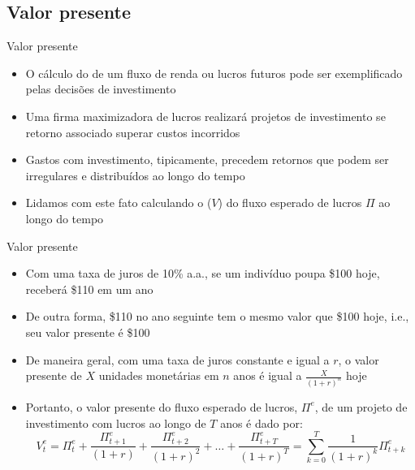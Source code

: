 \documentclass[10pt]{beamer}
\begin{document}
\subsection{Valor presente}
\begin{frame}
    {Valor presente}
    \begin{itemize}
        \item O cálculo do  de um fluxo de renda ou lucros futuros pode ser exemplificado pelas decisões de investimento\bigskip
        \item Uma firma maximizadora de lucros realizará projetos de investimento se retorno associado superar custos incorridos\bigskip
        \item Gastos com investimento, tipicamente, precedem retornos que podem ser irregulares e distribuídos ao longo do tempo\bigskip
        \item Lidamos com este fato calculando o  ($V$) do fluxo esperado de lucros $\Pi$ ao longo do tempo
    \end{itemize}
\end{frame}

\begin{frame}
    {Valor presente}
    \begin{itemize}
        \item Com uma taxa de juros de 10\% a.a., se um indivíduo poupa \$100 hoje, receberá \$110 em um ano\bigskip
        \item De outra forma, \$110 no ano seguinte tem o mesmo valor que \$100 hoje, i.e., seu valor presente é \$100\bigskip
        \item De maneira geral, com uma taxa de juros constante e igual a $r$, o valor presente de $X$ unidades monetárias em $n$ anos é igual a $\frac{X}{(1 + r)^n}$ hoje\bigskip
        \item Portanto, o valor presente do fluxo esperado de lucros, $\Pi^e$, de um projeto de investimento com lucros ao longo de $T$ anos é dado por:
        \begin{equation}
            V_t^e = \Pi_t^e + \frac{\Pi_{t+1}^e}{(1 + r)} + \frac{\Pi_{t+2}^e}{(1 + r)^2} + \dots + \frac{\Pi_{t+T}^e}{(1 + r)^T} = \sum_{k = 0}^T \frac{1}{(1 + r)^k}\Pi_{t+k}^e\label{aula7_eq1}
        \end{equation}
    \end{itemize}
\end{frame}
\end{document}
